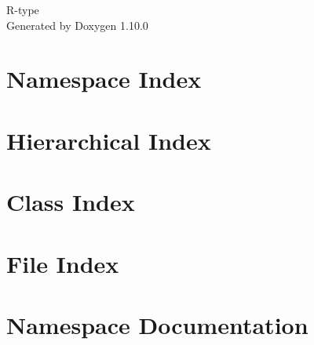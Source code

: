 \documentclass[twoside]{book}
\newcommand{\+}{\discretionary{\mbox{\scriptsize$\hookleftarrow$}}{}{}}
\newcommand{\clearemptydoublepage}{%
    \newpage{\pagestyle{empty}\cleardoublepage}%
  }
\begin{document}
  \raggedbottom
    \hypersetup{pageanchor=false,
                bookmarksnumbered=true,
                pdfencoding=unicode
               }
  \begin{titlepage}
  \vspace*{7cm}
  \begin{center}%
  {\Large R-\/type}\\
  \vspace*{1cm}
  {\large Generated by Doxygen 1.10.0}\\
  \end{center}
  \end{titlepage}
  \clearemptydoublepage
  \tableofcontents
  \clearemptydoublepage
  \hypersetup{pageanchor=true}




\chapter{Namespace Index}

\chapter{Hierarchical Index}

\chapter{Class Index}

\chapter{File Index}

\chapter{Namespace Documentation}






\end{document}
